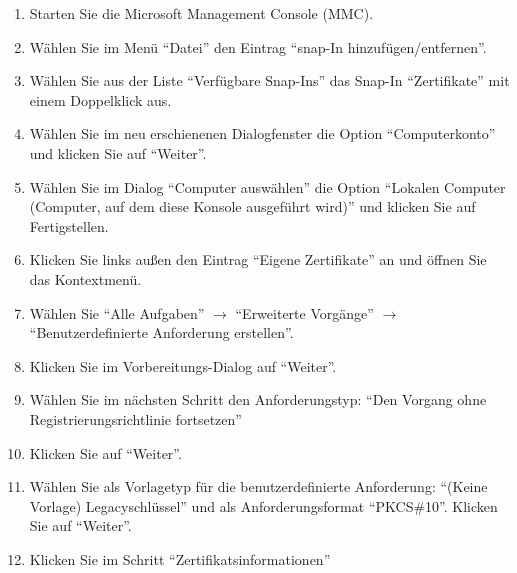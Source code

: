           \begin{enumerate}
            \item Starten Sie die Microsoft Management Console (MMC).
            \item Wählen Sie im Menü \enquote{Datei} den Eintrag
            \enquote{snap-In hinzufügen/entfernen}.
            \item Wählen Sie aus der Liste \enquote{Verfügbare Snap-Ins} das
            Snap-In \enquote{Zertifikate} mit einem Doppelklick aus.
            \item Wählen Sie im neu erschienenen Dialogfenster die Option
            \enquote{Computerkonto} und klicken Sie auf \enquote{Weiter}.
            \item Wählen Sie im Dialog \enquote{Computer auswählen} die Option
            \enquote{Lokalen Computer (Computer, auf dem diese Konsole
            ausgeführt wird)} und klicken Sie auf Fertigstellen.
            \item Klicken Sie links außen den Eintrag \enquote{Eigene
            Zertifikate} an und öffnen Sie das Kontextmenü.
            \item Wählen Sie \enquote{Alle Aufgaben} $\rightarrow$
            \enquote{Erweiterte Vorgänge} $\rightarrow$
            \enquote{Benutzerdefinierte Anforderung erstellen}.
            \item Klicken Sie im Vorbereitungs-Dialog auf \enquote{Weiter}.
            \item Wählen Sie im nächsten Schritt den
            Anforderungstyp: \enquote{Den Vorgang ohne Registrierungsrichtlinie
            fortsetzen}
            \item Klicken Sie auf \enquote{Weiter}.
\clearpage
            \item Wählen Sie als Vorlagetyp für die benutzerdefinierte
            Anforderung: \enquote{(Keine Vorlage) Legacyschlüssel} und als
            Anforderungsformat \enquote{PKCS\#10}. Klicken Sie auf
            \enquote{Weiter}.
            \item Klicken Sie im Schritt \enquote{Zertifikatsinformationen}

\end{enumerate}
